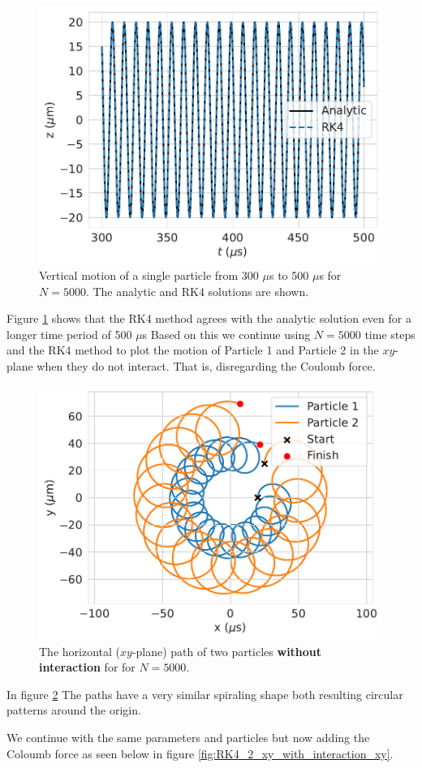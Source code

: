 \documentclass[english,notitlepage,reprint,nofootinbib]{revtex4-1}  %
\begin{document}
\begin{figure}[H]
    \centering
    \includegraphics[width=.5\textwidth]{../figures/analytic_RK4_t_axis_2_N5000.pdf}
    \caption{Vertical motion of a single particle from 300 $\mu$s to  500 $\mu$s for $N=5000$. The analytic and RK4 solutions are shown.}
    \label{fig:analytic_RK4_t_axis_2_N5000}
\end{figure}

Figure \ref{fig:analytic_RK4_t_axis_2_N5000} shows that the RK4 method agrees with the analytic solution even for a longer time period of 500 $\mu$s
Based on this we continue using $N=5000$ time steps and the RK4 method to plot the motion of Particle 1 and Particle 2 in the $xy$-plane when they do not interact.
That is, disregarding the Coulomb force.
\begin{figure}[H]
    \centering
    \includegraphics[width=.5\textwidth]{../figures/2p_N5000_RK4_xy.pdf}
    \caption{The horizontal ($xy$-plane) path of two particles \textbf{without interaction} for for $N = 5000$.}
    \label{fig:RK4_2_xy_no_interaction_xy}
\end{figure}
In figure \ref{fig:RK4_2_xy_no_interaction_xy}
The paths have a very similar spiraling shape both resulting circular patterns around the origin.

We continue with the same parameters and particles but now adding the Coloumb force as seen below in figure \ref{fig:RK4_2_xy_with_interaction_xy}.
\end{document}
